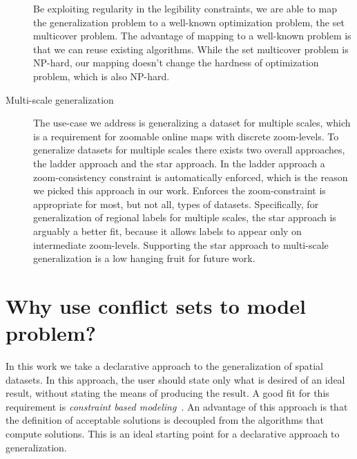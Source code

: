 \documentclass[11pt, oneside]{article}   	%
\begin{document}
\begin{description}
Be exploiting regularity in the legibility constraints, we are able to map the generalization problem to a well-known optimization problem, the set multicover problem. The advantage of mapping to a well-known problem is that we can reuse existing algorithms. While the set multicover problem is NP-hard, our mapping doesn't change the hardness of optimization problem, which is also NP-hard.

\item[Multi-scale generalization] The use-case we address is generalizing a dataset for multiple scales, which is a requirement for zoomable online maps with discrete zoom-levels. To generalize datasets for multiple scales there exists two overall approaches, the ladder approach and the star approach. In the ladder approach a zoom-consistency constraint is automatically enforced, which is the reason we picked this approach in our work. Enforces the zoom-constraint is appropriate for most, but not all, types of datasets. Specifically, for generalization of regional labels for multiple scales, the star approach is arguably a better fit, because it allows labels to appear only on intermediate zoom-levels. Supporting the star approach to multi-scale generalization is a low hanging fruit for future work.  
\end{description}

\section{Why use conflict sets to model problem?}



In this work we take a declarative approach to the generalization of spatial datasets. In this approach, the user should state only what is desired of an ideal result, without stating the means of producing the result. A good fit for this requirement is \emph{constraint based modeling}~\cite{beard1991constraints,harrie1999constraint}. An advantage of this approach is that the definition of acceptable solutions is decoupled from the algorithms that compute solutions. This is an ideal starting point for a declarative approach to generalization.
\end{document}
